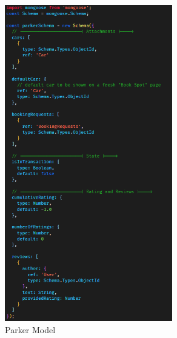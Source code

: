                    \begin{figure}[h]
                        \centering
                        \includegraphics[width=0.65\textwidth]{images/parkerModel.png}
                        \caption{Parker Model}
                        \label{fig:parkerModel}
                    \end{figure}



